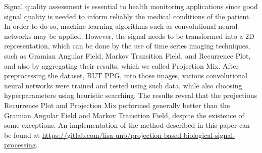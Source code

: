 Signal quality assessment is essential to health monitoring applications since good signal quality is needed to inform reliably the medical conditions of the patient. In order to do so, machine learning algorithms such as convolutional neural networks may be applied. However, the signal needs to be transformed into a 2D representation, which can be done by the use of time series imaging techniques, such as Gramian Angular Field, Markov Transition Field, and Recurrence Plot, and also by aggregating their results, which we called Projection Mix. After preprocessing the dataset, BUT PPG, into those images, various convolutional neural networks were trained and tested using such data, while also choosing hyperparameters using heuristic searching. The results reveal that the projections Recurrence Plot and Projection Mix performed generally better than the Gramian Angular Field and Markov Transition Field, despite the existence of some exceptions. An implementation of the method described in this paper can be found at \url{https://gitlab.com/lisa-unb/projection-based-biological-signal-processing}.
